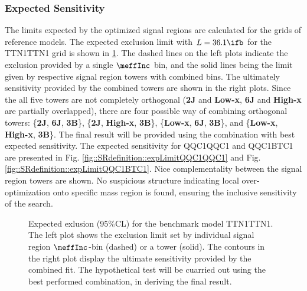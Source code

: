 \subsubsection{Expected Sensitivity}
The limits expected by the optimized signal regions are calculated for the grids of reference models.
The expected exclusion limit with $L=36.1\ifb$ for the TTN1TTN1 \dire grid is shown in \ref{fig::SRdefinition::expLimitTTN1TTN1}. 
The dashed lines on the left plots indicate the exclusion provided by a single $\meffInc$ bin, and the solid lines being the limit given by respective signal region towers with combined bins. 
The ultimately sensitivity provided by the combined towers are shown in the right plots. 
Since the all five towers are not completely orthogonal (\textbf{2J} and \textbf{Low-x}, \textbf{6J} and \textbf{High-x} are partially overlapped), 
there are four possible way of combining orthogonal towers: \{\textbf{2J}, \textbf{6J}, \textbf{3B}\}, \{\textbf{2J}, \textbf{High-x}, \textbf{3B}\}, \{\textbf{Low-x}, \textbf{6J}, \textbf{3B}\}, and \{\textbf{Low-x}, \textbf{High-x}, \textbf{3B}\}.
The final result will be provided using the combination with best expected sensitivity. 
The expected sensitivity for QQC1QQC1 and QQC1BTC1 are presented in Fig. \ref{fig::SRdefinition::expLimitQQC1QQC1} and Fig. \ref{fig::SRdefinition::expLimitQQC1BTC1}. Nice complementality between the signal region towers are shown. No suspicious structure indicating local over-optimization onto specific mass region is found, ensuring the inclusive sensitivity of the search. 
\begin{figure}[h]
  \centering
    \caption{Expected exlusion (95$\%$CL) for the benchmark model TTN1TTN1. The left plot shows the exclusion limit set by individual signal region $\meffInc$-bin (dashed) or a tower (solid). The contours in the right plot display the ultimate sensitivity provided by the combined fit. The hypothetical test will be cuarried out using the best performed combination, in deriving the final result. }
    \label{fig::SRdefinition::expLimitTTN1TTN1}
\end{figure}



